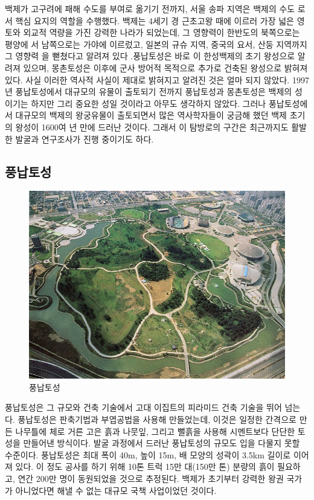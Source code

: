 백제가 고구려에 패해 수도를 부여로 옮기기 전까지, 서울 송파 지역은 백제의 수도
로서 핵심 요지의 역할을 수행했다. 백제는 4세기 경 근초고왕 때에 이르러 가장 넓은 영토와 
외교적 역량을 가진 강력한 나라가 되었는데, 그 영향력이 한반도의 북쪽으로는 평양에
서 남쪽으로는 가야에 이르렀고, 일본의 규슈 지역, 중국의 요서, 산둥 지역까지 그 영향력
을 뻗쳤다고 알려져 있다 .풍납토성은 바로 이 한성백제의 초기 왕성으로 알려져 있으며,
몽촌토성은 이후에 군사 방어적 목적으로 추가로 건축된 왕성으로 밝혀져 있다. 사실 이러한
역사적 사실이 제대로 밝혀지고 알려진 것은 얼마 되지 않았다. 1997년 풍납토성에서
대규모의 유물이 출토되기 전까지 풍납토성과 몽촌토성은 백제의 성이기는 하지만 그리 
중요한 성일 것이라고 아무도 생각하지 않았다. 그러나 풍납토성에서 대규모의 백제의 
왕궁유물이 출토되면서 많은 역사학자들이 궁금해 했던 백제 초기의 왕성이 1600여 년 만에
드러난 것이다. 그래서 이 탐방로의 구간은 최근까지도 활발한 발굴과 연구조사가 진행 
중이기도 하다.

\subsection{풍납토성}

\begin{figure}
    \centering
    \includegraphics[width=.6\textwidth]{e_img/ww_-004.jpg}
    \caption{풍납토성}
    \label{fig:haryu5}
\end{figure}

풍납토성은 그 규모와 건축 기술에서 고대 이집트의 피라미드 건축 기술을 뛰어 넘는
다. 풍납토성은 판축기법과 부엽공법을 사용해 만들었는데, 이것은 일정한 간격으로 만든
나무틀에 체로 거른 고은 흙과 나뭇잎, 그리고 뻘흙을 사용해 시멘트보다 단단한 토성을 
만들어낸 방식이다. 발굴 과정에서 드러난 풍납토성의 규모도 입을 다물지 못할 수준이다. 
풍납토성은 최대 폭이 40m, 높이 15m, 배 모양의 성곽이 3.5km 길이로 이어져 있다. 이 정도
공사를 하기 위해 10톤 트럭 15만 대(150만 톤) 분량의 흙이 필요하고, 연간 200만 
명이 동원되었을 것으로 추정된다. 백제가 초기부터 강력한 왕권 국가가 아니었다면 해낼 수
없는 대규모 국책 사업이었던 것이다.

